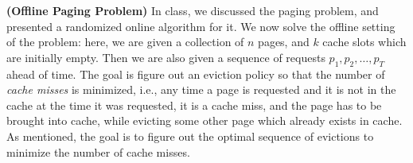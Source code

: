 \documentclass[solution,addpoints,12pt]{exam}
\begin{document}
\begin{questions}

\question[25] \textbf{(Offline Paging Problem)} In class, we discussed the paging problem, and presented a randomized online algorithm for it. We now solve the offline setting of the problem: here, we are given a collection of $n$ pages, and $k$ cache slots which are initially empty. Then we are also given a sequence of requests $p_1, p_2, \ldots, p_T$ ahead of time. The goal is figure out an eviction policy so that the number of \emph{cache misses} is minimized, i.e., any time a page is requested and it is not in the cache at the time it was requested, it is a cache miss, and the page has to be brought into cache, while evicting some other page which already exists in cache. As mentioned, the goal is to figure out the optimal sequence of evictions to minimize the number of cache misses.

\end{questions}
\end{document}
